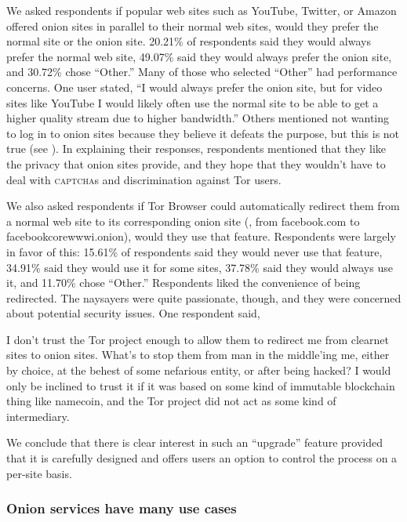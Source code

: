 We asked respondents if popular web sites such as YouTube, Twitter, or Amazon
offered onion sites in parallel to their normal web sites, would they prefer the
normal site or the onion site. 20.21\% of respondents said they would always
prefer the normal web site, 49.07\% said they would always prefer the onion
site, and 30.72\% chose ``Other.'' Many of those who selected ``Other'' had
performance concerns.  One user stated, ``I would always prefer the onion site,
but for video sites like YouTube I would likely often use the normal site to be
able to get a higher quality stream due to higher bandwidth.'' Others mentioned
not wanting to log in to onion sites because they believe it defeats the
purpose, but this is not true (see ).  In explaining
their responses, respondents mentioned that they like the privacy that onion
sites provide, and they hope that they wouldn't have to deal with
\textsc{captcha}s and discrimination against Tor users.

We also asked respondents if Tor Browser could automatically redirect them from
a normal web site to its corresponding onion site (\eg, from facebook.com to
facebookcorewwwi.onion), would they use that feature. Respondents were largely
in favor of this: 15.61\% of respondents said they would never use that feature,
34.91\% said they would use it for some sites, 37.78\% said they would always
use it, and 11.70\% chose ``Other.'' Respondents liked the convenience of being
redirected.  The naysayers were quite passionate, though, and they were
concerned about potential security issues. One respondent said, 

\begin{displayquote}
I don't trust the Tor project enough to allow them to redirect me from clearnet
sites to onion sites.  What's to stop them from man in the middle'ing me, either
by choice, at the behest of some nefarious entity, or after being hacked? I
would only be inclined to trust it if it was based on some kind of immutable
blockchain thing like namecoin, and the Tor project did not act as some kind of
intermediary.
\end{displayquote}

We conclude that there is clear interest in such an ``upgrade'' feature provided
that it is carefully designed and offers users an option to control the process
on a per-site basis.

\subsubsection{Onion services have many use cases}

